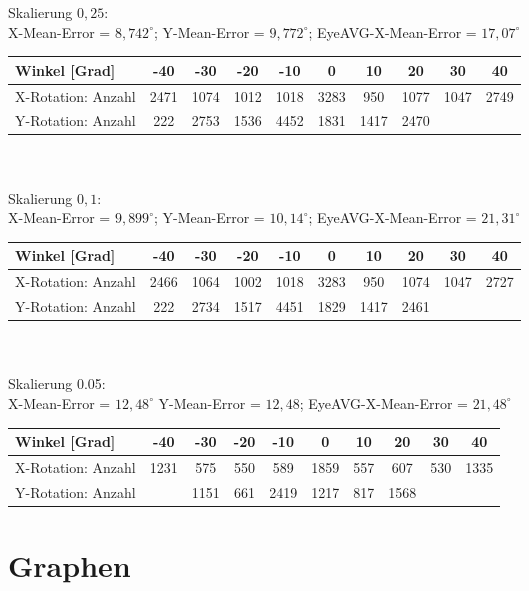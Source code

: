 Skalierung $0,25$:\\
X-Mean-Error = $8,742^\circ$; Y-Mean-Error = $9,772^\circ$; EyeAVG-X-Mean-Error = $17,07^\circ$\\
\begin{tabular}{|l|c|c|c|c|c|c|c|c|c|}
\hline 
Winkel [Grad]&-40&-30&-20&-10&0&10&20&30&40\\
\hline 
X-Rotation: Anzahl&2471&1074&1012&1018&3283&950&1077&1047&2749\\ 
\hline 
Y-Rotation: Anzahl&222&2753&1536&4452&1831&1417&2470&&\\
\hline
\end{tabular}\\\\
Skalierung $0,1$:\\
X-Mean-Error = $9,899^\circ$; Y-Mean-Error = $10,14^\circ$; EyeAVG-X-Mean-Error = $21,31^\circ$\\
\begin{tabular}{|l|c|c|c|c|c|c|c|c|c|}
\hline 
Winkel [Grad]&-40&-30&-20&-10&0&10&20&30&40\\
\hline 
X-Rotation: Anzahl&2466&1064&1002&1018&3283&950&1074&1047&2727\\ 
\hline 
Y-Rotation: Anzahl&222&2734&1517&4451&1829&1417&2461&&\\
\hline
\end{tabular}\\\\
Skalierung 0.05:\\
X-Mean-Error = $12,48^\circ$ Y-Mean-Error = $12,48$; EyeAVG-X-Mean-Error = $21,48^\circ$\\
\begin{tabular}{|l|c|c|c|c|c|c|c|c|c|}
\hline 
Winkel [Grad]&-40&-30&-20&-10&0&10&20&30&40\\
\hline 
X-Rotation: Anzahl&1231&575&550&589&1859&557&607&530&1335\\ 
\hline 
Y-Rotation: Anzahl&&1151&661&2419&1217&817&1568&&\\
\hline
\end{tabular}
\section{Graphen}